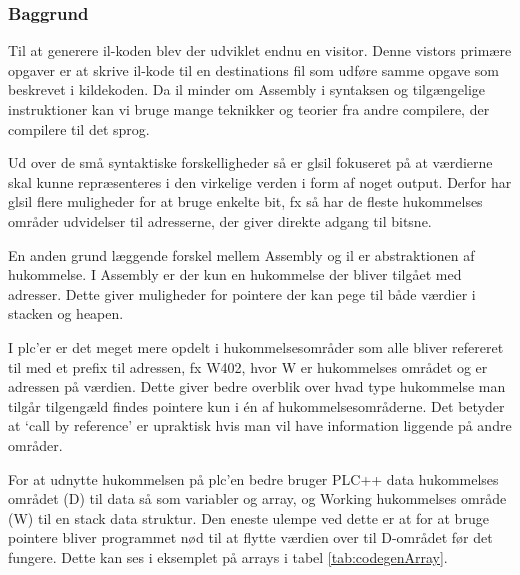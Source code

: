 \subsubsection{Baggrund}
Til at generere \gls{il}-koden blev der udviklet endnu en visitor. Denne vistors primære opgaver er at skrive \gls{il}-kode til en destinations fil som udføre samme opgave som beskrevet i kildekoden. Da \gls{il} minder om Assembly i syntaksen og tilgængelige instruktioner kan vi bruge mange teknikker og teorier fra andre compilere, der compilere til det sprog.

Ud over de små syntaktiske forskelligheder så er gls{il} fokuseret på at værdierne skal kunne repræsenteres i den virkelige verden i form af noget output. Derfor har gls{il} flere muligheder for at bruge enkelte bit, fx så har de fleste hukommelses områder udvidelser til adresserne, der giver direkte adgang til bitsne. 

En anden grund læggende forskel mellem Assembly og \gls{il} er abstraktionen af hukommelse. I Assembly er der kun en hukommelse der bliver tilgået med adresser. Dette giver muligheder for pointere der kan pege til både værdier i stacken og heapen.

I \gls{plc}'er er det meget mere opdelt i hukommelsesområder som alle bliver refereret til med et prefix til adressen, fx {\ttfamily W402}, hvor {\ttfamily W} er hukommelses området og {} er adressen på værdien. Dette giver bedre overblik over hvad type hukommelse man tilgår tilgengæld findes pointere kun i én af hukommelsesområderne. Det betyder at \enquote*{call by reference} er upraktisk hvis man vil have information liggende på andre områder.

For at udnytte hukommelsen på \gls{plc}'en bedre bruger PLC++ data hukommelses området ({\ttfamily D}) til data så som variabler og array, og Working hukommelses område ({\ttfamily W}) til en stack data struktur. Den eneste ulempe ved dette er at for at bruge pointere bliver programmet nød til at flytte værdien over til {\ttfamily D}-området før det fungere. Dette kan ses i eksemplet på arrays i tabel \ref{tab:codegenArray}.